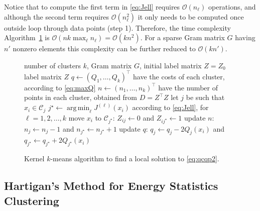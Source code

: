 \documentclass[aps,preprint,nofootinbib,floatfix]{revtex4-1}
\DeclareMathOperator*{\argmin}{arg\,min}
\newcommand\C{{\mathcal{C}}}
\newcommand\OO{{\mathcal{O}}}
\begin{document}
Notice that to compute the first term in \eqref{eq:Jell} requires
$\OO(n_\ell)$ operations, and although the second term requires
$\OO(n_\ell^2)$ it only needs to be computed once outside loop through
data points (step 1).
Therefore, the time complexity Algorithm~\ref{kmeans_algo} is
$\OO(n k \max_\ell n_\ell) = \OO(k n^2)$. For a sparse
Gram matrix $G$ having
$n'$ nonzero elements this complexity can be further reduced
to $\OO(k n')$. 

\begin{figure}
\begin{algorithm}[H]
\vspace{.5em}
\begin{algorithmic}[1]
    \INPUT number of clusters $k$, Gram matrix $G$, initial label
    matrix $Z = Z_0$
    \OUTPUT label matrix $Z$ 
  \STATE $q \leftarrow (Q_1, \dotsc, Q_k)^\top$ 
            have the costs of each cluster, according to \eqref{eq:maxQ}
  \STATE $n \leftarrow (n_1,\dotsc,n_k)^\top$ 
        have the number of points in each cluster, obtained 
        from $D = Z^\top Z$
  \REPEAT
        \STATE let $j$ be such that $x_i \in \C_j$
        \STATE $j^\star \leftarrow \argmin_{\ell} J^{(\ell)}(x_i)$
            according to \eqref{eq:Jell}, for $\ell=1,2,\dots,k$
            \STATE move $x_i$ to $\C_{j^\star}$: $Z_{ij} \leftarrow 0$ and
            $Z_{ij^\star} \leftarrow 1$
            \STATE update $n$: $n_j \leftarrow n_j - 1$ and
                    $n_{j^\star} \leftarrow n_{j^\star} + 1$
            \STATE update $q$: $q_j \leftarrow q_j - 2Q_j(x_i)$ and
    $q_{j^\star} \leftarrow q_{j^\star} + 2Q_{j^\star}(x_i)$
        \ENDIF
    \ENDFOR
\end{algorithmic}
\caption{\label{kmeans_algo}
Kernel $k$-means algorithm 
to find a local solution to \eqref{eq:qcqp2}.
\hspace{\fill}
}
\end{algorithm}
\end{figure}

\subsection*{Hartigan's Method for Energy Statistics Clustering}
\end{document}
